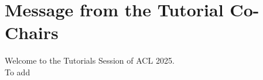 \section{Message from the Tutorial Co-Chairs}
\vspace*{0.2cm}

Welcome to the Tutorials Session of ACL 2025.\\

To add
